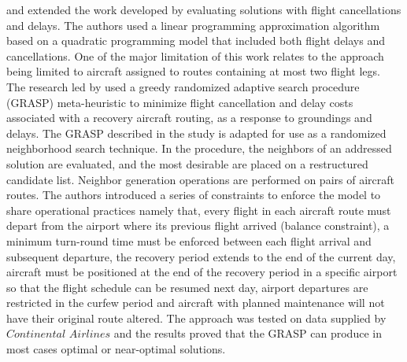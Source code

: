 \documentclass[ijoo,nonblindrev]{informs-ijoo}
\begin{document}
\citep{Cao1997-I} and \citep{Cao1997-II} extended the work developed by \cite{Jarrah1993} evaluating solutions with flight cancellations and delays. The authors used a linear programming approximation algorithm based on   a quadratic programming model that included both flight delays and cancellations. One of the major limitation of this work relates to the approach being limited to aircraft assigned to routes containing at most two flight legs.\\
The research led by \citep{Arguello1997} used a greedy randomized adaptive search procedure (GRASP) meta-heuristic to minimize flight cancellation and delay costs associated with a recovery aircraft routing, as a response to groundings and delays. The GRASP described in the study is adapted for use as a randomized neighborhood search technique. In the procedure, the neighbors of an addressed solution are evaluated, and the most desirable are placed on a restructured candidate list. Neighbor generation operations are performed on pairs of aircraft routes. The authors introduced a series of constraints to enforce the model to share operational practices namely that, every flight in each aircraft route must depart from the airport where its previous flight arrived (balance constraint), a minimum turn-round time must be enforced between each flight arrival and subsequent departure, the recovery period extends to the end of the current day, aircraft must be positioned at the end of the recovery period in a specific airport so that the flight schedule can be resumed next day, airport departures are restricted in the curfew period and aircraft with planned maintenance will not have their original route altered. The approach was tested on data supplied by $Continental$ $Airlines$ and the results proved that  the GRASP can produce in  most cases optimal or near-optimal solutions.\\
\end{document}
